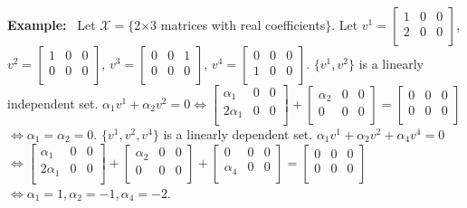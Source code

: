 \documentclass[letterpaper]{article}
\begin{document}
\noindent \textbf{Example:}~ Let $\mathcal{X}=\{$2$\times$3 matrices with real coefficients$\}$. Let $v^1=\begin{bmatrix}
    1 & 0 & 0\\
    2 & 0 & 0\\
    \end{bmatrix}$, $v^2=\begin{bmatrix}
    1 & 0 & 0\\
    0 & 0 & 0\\
    \end{bmatrix}$, $v^3=\begin{bmatrix}
    0 & 0 & 1\\
    0 & 0 & 0\\
    \end{bmatrix}$, $v^4=\begin{bmatrix}
    0 & 0 & 0\\
    1 & 0 & 0\\
    \end{bmatrix}$.
    \newline\newline
    $\{v^1,v^2\}$ is a linearly independent set.
    \newline
    $\alpha_1v^1+\alpha_2v^2=0\iff\begin{bmatrix}
    \alpha_1 & 0 & 0\\
    2\alpha_1 & 0 & 0\\
    \end{bmatrix} + \begin{bmatrix}
    \alpha_2 & 0 & 0\\
    0 & 0 & 0\\
    \end{bmatrix} = \begin{bmatrix}
    0 & 0 & 0\\
    0 & 0 & 0\\
    \end{bmatrix}$
    \newline$
    \iff\alpha_1=\alpha_2=0$.
    \newpage
    $\{v^1,v^2,v^4\}$ is a linearly dependent set.
    \newline
    $\alpha_1v^1+\alpha_2v^2+\alpha_4v^4=0$
    \newline
    $\iff\begin{bmatrix}
    \alpha_1 & 0 & 0\\
    2\alpha_1 & 0 & 0\\
    \end{bmatrix} + \begin{bmatrix}
    \alpha_2 & 0 & 0\\
    0 & 0 & 0\\
    \end{bmatrix} + \begin{bmatrix}
    0 & 0 & 0\\
    \alpha_4 & 0 & 0\\
    \end{bmatrix}= \begin{bmatrix}
    0 & 0 & 0\\
    0 & 0 & 0\\
    \end{bmatrix}$
    \newline
    $\iff\alpha_1=1, \alpha_2=-1, \alpha_4=-2$.
\end{document}
